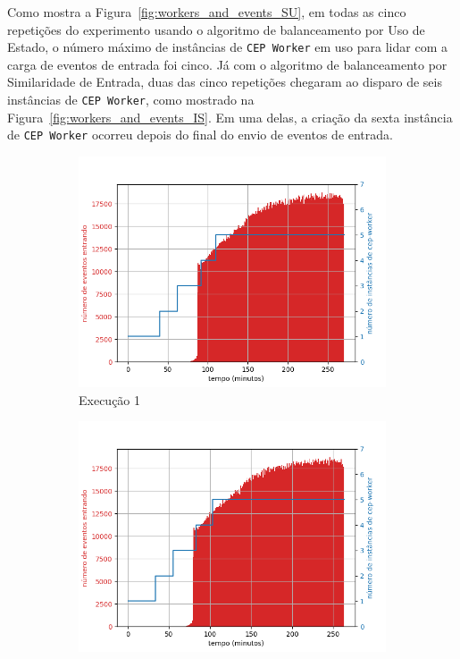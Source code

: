 Como mostra a Figura~\ref{fig:workers_and_events_SU}, em todas as cinco repetições do experimento usando o algoritmo de balanceamento por Uso de Estado, o número máximo de instâncias de \texttt{CEP Worker} em uso para lidar com a carga de eventos de entrada foi cinco. Já com o algoritmo de balanceamento por Similaridade de Entrada, duas das cinco repetições chegaram ao disparo de seis instâncias de \texttt{CEP Worker}, como mostrado na Figura~\ref{fig:workers_and_events_IS}. Em uma delas, a criação da sexta instância de \texttt{CEP Worker} ocorreu depois do final do envio de eventos de entrada. 

\begin{figure}[p]
\begin{subfigure}{.5\textwidth}
  \centering
  \includegraphics[width=\linewidth]{figuras/graphics/carga_e_workers_total5-dez-su.png}  
  \caption{Execução 1}
  \label{fig:cewt-5-dez-su}
\end{subfigure}
\begin{subfigure}{.5\textwidth}
  \centering
  \includegraphics[width=\linewidth]{figuras/graphics/carga_e_workers_total7-dez-su.png}  

\end{subfigure}
\end{figure}
